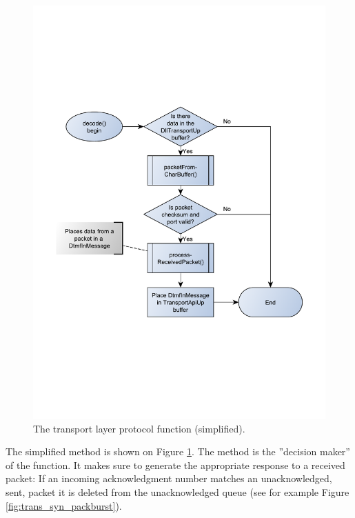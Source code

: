 \begin{figure}[htb]
 \centering
 \includegraphics[scale=0.66,trim=0 200 0 200]{content/graphics/transport/trans_decode_flowchart_simple.pdf}%
 \caption{The transport layer protocol  function (simplified).}
 \label{fig:trans_decode_flowchart_simple}
\end{figure}

The simplified  method is shown on Figure \ref{fig:trans_decode_flowchart_simple}. The  method is the ''decision maker'' of the  function. It makes sure to generate the appropriate response to a received packet: If an incoming acknowledgment number matches an unacknowledged, sent, packet it is deleted from the unacknowledged queue (see for example Figure \ref{fig:trans_syn_packburst}).


